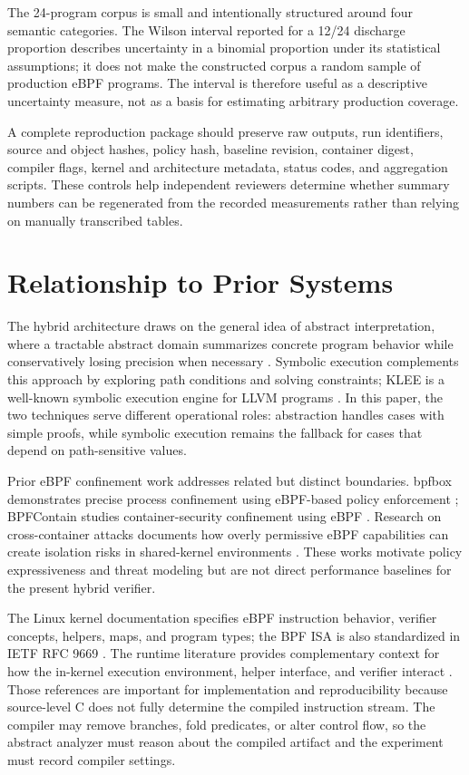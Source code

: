 The 24-program corpus is small and intentionally structured around four semantic categories. The Wilson interval reported for a 12/24 discharge proportion describes uncertainty in a binomial proportion under its statistical assumptions; it does not make the constructed corpus a random sample of production eBPF programs. The interval is therefore useful as a descriptive uncertainty measure, not as a basis for estimating arbitrary production coverage.

A complete reproduction package should preserve raw outputs, run identifiers, source and object hashes, policy hash, baseline revision, container digest, compiler flags, kernel and architecture metadata, status codes, and aggregation scripts. These controls help independent reviewers determine whether summary numbers can be regenerated from the recorded measurements rather than relying on manually transcribed tables.

\section{Relationship to Prior Systems}
The hybrid architecture draws on the general idea of abstract interpretation, where a tractable abstract domain summarizes concrete program behavior while conservatively losing precision when necessary \citep{cousot1977abstract}. Symbolic execution complements this approach by exploring path conditions and solving constraints; KLEE is a well-known symbolic execution engine for LLVM programs \citep{cadar2008klee}. In this paper, the two techniques serve different operational roles: abstraction handles cases with simple proofs, while symbolic execution remains the fallback for cases that depend on path-sensitive values.

Prior eBPF confinement work addresses related but distinct boundaries. bpfbox demonstrates precise process confinement using eBPF-based policy enforcement \citep{findlay2020bpfbox}; BPFContain studies container-security confinement using eBPF \citep{findlay2021bpfcontain}. Research on cross-container attacks documents how overly permissive eBPF capabilities can create isolation risks in shared-kernel environments \citep{he2023crosscontainer}. These works motivate policy expressiveness and threat modeling but are not direct performance baselines for the present hybrid verifier.

The Linux kernel documentation specifies eBPF instruction behavior, verifier concepts, helpers, maps, and program types; the BPF ISA is also standardized in IETF RFC 9669 \citep{linuxbpfdocs,thaler2024bpfisa}. The runtime literature provides complementary context for how the in-kernel execution environment, helper interface, and verifier interact \citep{gbadamosi2024ebpfruntime}. Those references are important for implementation and reproducibility because source-level C does not fully determine the compiled instruction stream. The compiler may remove branches, fold predicates, or alter control flow, so the abstract analyzer must reason about the compiled artifact and the experiment must record compiler settings.


